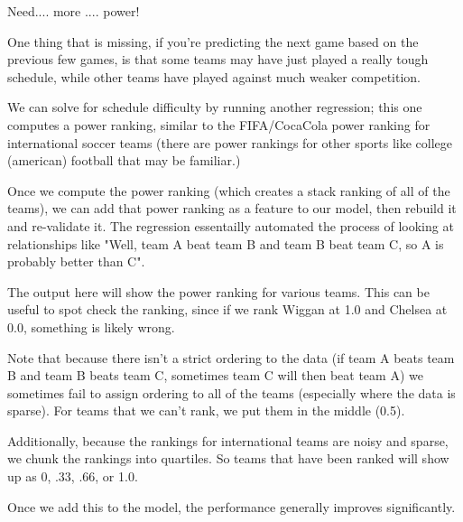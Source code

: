\documentclass[12pt,fleqn]{article}\usepackage{common}
\begin{document}
Need.... more .... power!

One thing that is missing, if you're predicting the next game based on the
previous few games, is that some teams may have just played a really tough
schedule, while other teams have played against much weaker competition.

We can solve for schedule difficulty by running another regression; this
one computes a power ranking, similar to the FIFA/CocaCola power ranking
for international soccer teams (there are power rankings for other sports
like college (american) football that may be familiar.)

Once we compute the power ranking (which creates a stack ranking of all of
the teams), we can add that power ranking as a feature to our model, then
rebuild it and re-validate it. The regression essentailly automated the
process of looking at relationships like "Well, team A beat team B and team
B beat team C, so A is probably better than C".

The output here will show the power ranking for various teams. This can be
useful to spot check the ranking, since if we rank Wiggan at 1.0 and
Chelsea at 0.0, something is likely wrong.

Note that because there isn't a strict ordering to the data (if team A
beats team B and team B beats team C, sometimes team C will then beat team
A) we sometimes fail to assign ordering to all of the teams (especially
where the data is sparse). For teams that we can't rank, we put them in the
middle (0.5).

Additionally, because the rankings for international teams are noisy and
sparse, we chunk the rankings into quartiles. So teams that have been
ranked will show up as 0, .33, .66, or 1.0.

Once we add this to the model, the performance generally improves significantly.
\end{document}
